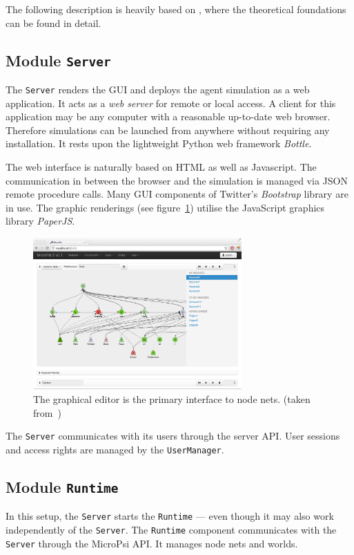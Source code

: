 The following description is heavily based on \cite{conf/agi/Bach12}, where the theoretical foundations can be found in detail.

        \subsection{Module \texttt{Server}}
The \texttt{Server} renders the GUI and deploys the agent simulation as a web application. It acts as a \emph{web server} for remote or local access. A client for this application may be any computer with a reasonable up-to-date web browser. Therefore simulations can be launched from anywhere without requiring any installation. It rests upon the lightweight Python web framework \emph{Bottle}.

The web interface is naturally based on HTML as well as Javascript. The communication in between the browser and the simulation is managed via JSON remote procedure calls. Many GUI components of Twitter's \emph{Bootstrap} library are in use. The graphic renderings (see figure~\ref{micropsi2_nodenet}) utilise the JavaScript graphics library \emph{PaperJS}. 

\begin{figure}[h]
  \centering
    \includegraphics[width=8cm]{graphics/micropsi2_nodenet}
  \caption{The graphical editor is the primary interface to node nets. (taken from~\cite{conf/agi/Bach12})}
  \label{micropsi2_nodenet}
\end{figure}

The \texttt{Server} communicates with its users through the server API. User sessions and access rights are managed by the \texttt{UserManager}.
   
        \subsection{Module \texttt{Runtime}}
In this setup, the \texttt{Server} starts the \texttt{Runtime} --- even though it may also work independently of the \texttt{Server}. The \texttt{Runtime} component communicates with the \texttt{Server} through the MicroPsi API. It manages node nets and worlds.

